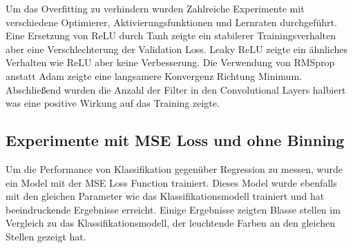 Um das Overfitting zu verhindern wurden Zahlreiche Experimente mit verschiedene Optimierer, Aktivierungsfunktionen und Lernraten durchgeführt.
Eine Ersetzung von ReLU durch Tanh zeigte ein stabilerer Trainingsverhalten aber eine Verschlechterung der Validation Loss. Leaky ReLU zeigte 
ein ähnliches Verhalten wie ReLU aber keine Verbesserung. Die Verwendung von RMSprop anstatt Adam zeigte eine langsamere Konvergenz Richtung Minimum.
Abschließend wurden die Anzahl der Filter in den Convolutional Layers halbiert was eine positive Wirkung auf das Training zeigte.   

\subsection{Experimente mit MSE Loss und ohne Binning}
Um die Performance von Klassifikation gegenüber Regression zu messen, wurde ein Model mit der MSE Loss Function trainiert. Dieses Model
wurde ebenfalls mit den gleichen Parameter wie das Klassifikationsmodell trainiert und hat beeindruckende Ergebnisse erreicht. Einige Ergebnisse
zeigten Blasse stellen im Vergleich zu das Klassifikationsmodell, der leuchtende Farben an den gleichen Stellen gezeigt hat.

